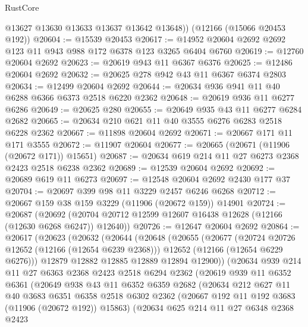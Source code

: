 \begin{lexlean}{RustCore}
\begin{coremodule}
        @13627
        @13630
        @13633
        @13637
        @13642
        @13648))
    (@12166 (@15066 @20453 @192))
@20604 := @15539 @20453
@20617 := @14952 @20604 @2692 @2692 @123 @11 @943 @988 @172 @6378 @123 @3265 @6404 @6760
@20619 := @12760 @20604 @2692
@20623 := @20619 @943 @11 @6367 @6376
@20625 := @12486 @20604 @2692
@20632 := @20625 @278 @942 @43 @11 @6367 @6374 @2803
@20634 := @12499 @20604 @2692
@20644 := @20634 @936 @941 @11 @40 @6288 @6366 @6373 @2518 @6220 @2362
@20648 := @20619 @936 @11 @6277 @6286
@20649 := @20625 @280
@20655 := @20649 @935 @43 @11 @6277 @6284 @2682
@20665 := @20634 @210 @621 @11 @40 @3555 @6276 @6283 @2518 @6228 @2362
@20667 := @11898 @20604 @2692
@20671 := @20667 @171 @11 @171 @3555
@20672 := @11907 @20604
@20677 := @20665 (@20671 (@11906 (@20672 @171)) @15651)
@20687 := @20634 @619 @214 @11 @27 @6273 @2368 @2423 @2518 @6238 @2362
@20689 := @12539 @20604 @2692
@20692 := @20689 @619 @11 @6273
@20697 := @12548 @20604 @2692 @2430 @177 @37
@20704 := @20697 @399 @98 @11 @3229 @2457 @6246 @6268
@20712 := @20667 @159 @38 @159 @3229 (@11906 (@20672 @159)) @14901
@20724 := @20687
    (@20692 (@20704 @20712 @12599 @12607 @16438 @12628 (@12166 (@12630 @6268 @6247)) @12640))
@20726 := @12647 @20604 @2692
@20864 := @20617
    (@20623
      (@20632
        (@20644
          (@20648
            (@20655
              (@20677
                (@20724 @20726 @12652 (@12166 (@12654 @6239 @2368)))
                @12652
                (@12166 (@12654 @6229 @6276)))
              @12879
              @12882
              @12885
              @12889
              @12894
              @12900))
          (@20634
            @939
            @214
            @11
            @27
            @6363
            @2368
            @2423
            @2518
            @6294
            @2362
            (@20619
              @939
              @11
              @6352
              @6361
              (@20649
                @938
                @43
                @11
                @6352
                @6359
                @2682
                (@20634
                  @212
                  @627
                  @11
                  @40
                  @3683
                  @6351
                  @6358
                  @2518
                  @6302
                  @2362
                  (@20667 @192 @11 @192 @3683 (@11906 (@20672 @192)) @15863)
                  (@20634
                    @625
                    @214
                    @11
                    @27
                    @6348
                    @2368
                    @2423

\end{coremodule}
\end{lexlean}
